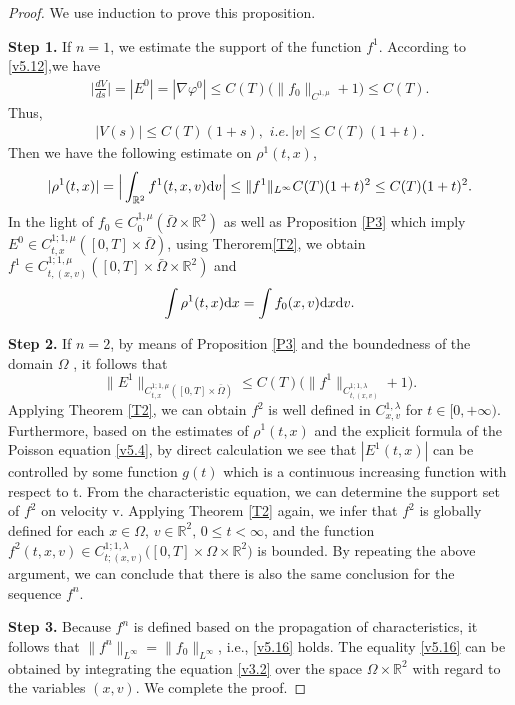\documentclass[11pt,reqno]{amsart}%
\theoremstyle{definition}
\theoremstyle{remark}
\begin{document}
\begin{proof}
We use induction to prove this proposition.

{\bf Step 1.} If $n=1$, we estimate the support of the function $f^{1}$.
According to \eqref{v5.12},we have
\begin{align}
\Big|\frac{d V}{d s}\Big|=|E^{0}|=|\nabla \varphi^{0}|\leq C(T)\Big(\|f_{0}\|_{C^{1,\mu}}+1\Big)\leq C(T). \nonumber
\end{align}
Thus,
\begin{align}
|V(s)|\leq C(T)(1+s), \,\, i.e. \, |v|\leq C(T)(1+t). \nonumber
\end{align}
Then  we have the following estimate on $\rho^{1}(t,x)$,
\begin{align}
|\rho^{1}(t,x)|=\Big|\int_{\mathbb{R}^{2}}f^{1}(t,x,v){\rm d}v\Big|\leq \|f^{1}\|_{L^{\infty}} C(T)(1+t)^{2}\leq C(T)(1+t)^{2}.\nonumber
\end{align}
 In the light of $f_{0}\in C^{1,\mu}_{0}(\bar{\Omega}\times \mathbb{R}^{2})$ as well as Proposition \ref{P3}
which imply $E^{0}\in C^{1;1,\mu}_{t,x}([0,T]\times \bar{\Omega})$, using Therorem\ref{T2}, we  obtain $f^{1}\in C^{1;1,\mu}_{t,(x,v)}([0,T]\times\bar{\Omega}\times\mathbb{R}^{2})$ and
$$ \int \rho^{1}(t,x){\rm d}x=\int f_{0}(x,v){\rm d}x{\rm d}v.$$

{\bf Step 2.} If $n=2$,
by means of Proposition \ref{P3} and the boundedness of the domain $\Omega$ , it follows that
$$\|E^{1}\|_{C^{1;1,\mu}_{t,x}([0,T]\times \bar{\Omega})}\leq C(T)\Big(\|f^{1}\|_{C^{1;1,\lambda}_{t,(x,v)}}+1\Big).$$
Applying Theorem \ref{T2}, we can obtain $f^{2}$ is well defined in $C^{1,\lambda}_{x,v}$ for $ t\in [0,+\infty).$
Furthermore, based on the estimates of $\rho^{1}(t,x)$ and  the explicit formula of the Poisson equation \eqref{v5.4}, 
by direct calculation we see that $|E^{1}(t,x)|$  can be controlled by some function $g(t)$ which is a continuous increasing function with respect to t.
From the characteristic equation, we can determine the support set of $f^{2}$ on velocity v.
Applying Theorem \ref{T2} again, we infer that $f^{2}$ is globally defined for each $x\in \Omega,\,v\in\mathbb{R}^{2},\,0\leq t<\infty $,
and the function $f^{2}(t,x,v)\in C^{1;1,\lambda}_{t;(x,v)}\big([0,T] \times\Omega\times\mathbb{R}^{2}\big)$  is bounded.
By repeating the above argument, we can conclude that there is also the same conclusion for the sequence $f^{n}$.

{\bf Step 3.}
Because  $f^{n}$ is defined based on the propagation of characteristics, it follows that $\|f^{n}\|_{L^{\infty}}=\|f_{0}\|_{L^{\infty}}$, i.e., \eqref{v5.16} holds.
The  equality \eqref{v5.16} can be obtained by integrating the equation \eqref{v3.2} over the space $\Omega\times\mathbb{R}^{2}$ with regard to the variables $(x,v)$.
 We complete the proof.
\end{proof}
\end{document}
